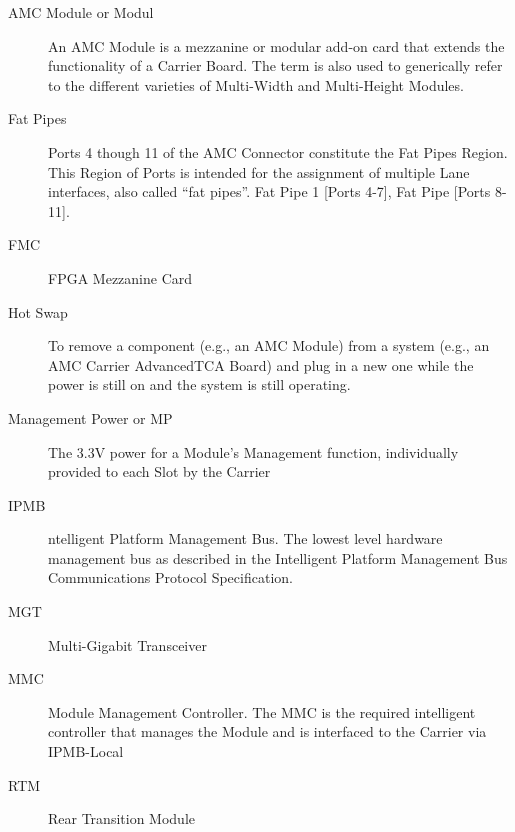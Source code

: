 \begin{description}
	\item[AMC Module or Modul] An AMC Module is a mezzanine or modular add-on card that extends the
	functionality of a Carrier Board. The term is also used to generically refer to the
	different varieties of Multi-Width and Multi-Height Modules.
	\item[Fat Pipes] Ports 4 though 11 of the AMC Connector constitute the Fat Pipes Region. This
	Region of Ports is intended for the assignment of multiple Lane interfaces, also
	called “fat pipes”. Fat Pipe 1 [Ports 4-7], Fat Pipe [Ports 8-11].
	\item[FMC] FPGA Mezzanine Card
	\item[Hot Swap] To remove a component (e.g., an AMC Module) from a system (e.g., an AMC Carrier
	AdvancedTCA Board) and plug in a new one while the power is still on and the
	system is still operating.
	\item[Management Power or MP] The 3.3V power for a Module's Management function, individually provided to each Slot by the Carrier
	\item[IPMB] ntelligent Platform Management Bus. The lowest level hardware management bus
	as described in the Intelligent Platform Management Bus Communications Protocol
	Specification.
	\item[MGT] Multi-Gigabit Transceiver
	\item[MMC] Module Management Controller. The MMC is the required intelligent controller that
	manages the Module and is interfaced to the Carrier via IPMB-Local
	\item[RTM] Rear Transition Module
\end{description}


